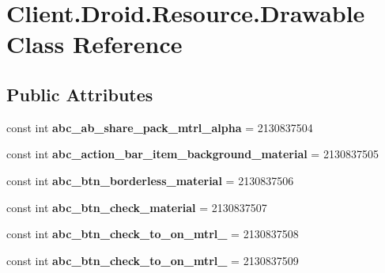 \hypertarget{classClient_1_1Droid_1_1Resource_1_1Drawable}{}\section{Client.\+Droid.\+Resource.\+Drawable Class Reference}
\label{classClient_1_1Droid_1_1Resource_1_1Drawable}
\subsection*{Public Attributes}
\begin{DoxyCompactItemize}
\item 
\hypertarget{classClient_1_1Droid_1_1Resource_1_1Drawable_a23016d2c7516aeabb0974c175003d10a}{}const int {\bfseries abc\+\_\+ab\+\_\+share\+\_\+pack\+\_\+mtrl\+\_\+alpha} = 2130837504\label{classClient_1_1Droid_1_1Resource_1_1Drawable_a23016d2c7516aeabb0974c175003d10a}

\item 
\hypertarget{classClient_1_1Droid_1_1Resource_1_1Drawable_a46c5e6e4af536d1ef0caf46144adced4}{}const int {\bfseries abc\+\_\+action\+\_\+bar\+\_\+item\+\_\+background\+\_\+material} = 2130837505\label{classClient_1_1Droid_1_1Resource_1_1Drawable_a46c5e6e4af536d1ef0caf46144adced4}

\item 
\hypertarget{classClient_1_1Droid_1_1Resource_1_1Drawable_a9ac757d7adfb63fb2c0fb5e68af8a373}{}const int {\bfseries abc\+\_\+btn\+\_\+borderless\+\_\+material} = 2130837506\label{classClient_1_1Droid_1_1Resource_1_1Drawable_a9ac757d7adfb63fb2c0fb5e68af8a373}

\item 
\hypertarget{classClient_1_1Droid_1_1Resource_1_1Drawable_a84ad258e4805ae8f73261cfc857aa5e5}{}const int {\bfseries abc\+\_\+btn\+\_\+check\+\_\+material} = 2130837507\label{classClient_1_1Droid_1_1Resource_1_1Drawable_a84ad258e4805ae8f73261cfc857aa5e5}

\item 
\hypertarget{classClient_1_1Droid_1_1Resource_1_1Drawable_ab28b825fc326e693cb11e7d699585638}{}const int {\bfseries abc\+\_\+btn\+\_\+check\+\_\+to\+\_\+on\+\_\+mtrl\+\_} = 2130837508\label{classClient_1_1Droid_1_1Resource_1_1Drawable_ab28b825fc326e693cb11e7d699585638}

\item 
\hypertarget{classClient_1_1Droid_1_1Resource_1_1Drawable_aaa2a96c6c11958a47ca52da9da35f019}{}const int {\bfseries abc\+\_\+btn\+\_\+check\+\_\+to\+\_\+on\+\_\+mtrl\+\_} = 2130837509\label{classClient_1_1Droid_1_1Resource_1_1Drawable_aaa2a96c6c11958a47ca52da9da35f019}


\end{DoxyCompactItemize}
